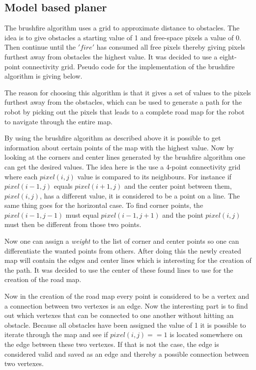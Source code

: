 \documentclass[../Head/Main.tex]{subfiles}
\begin{document}
\subsection{Model based planer}
The brushfire algorithm uses a grid to approximate distance to obstacles. The idea is to give obstacles a starting value of 1 and free-space pixels a value of 0. Then continue until the $'fire'$ has consumed all free pixels thereby giving pixels furthest away from obstacles the highest value. It was decided to use a eight-point connectivity grid. Pseudo code for the implementation of the brushfire algorithm is giving below. \par

The reason for choosing this algorithm is that it gives a set of values to the pixels furthest away from the obstacles, which can be used to generate a path for the robot by picking out the pixels that leads to a complete road map for the robot to navigate through the entire map. \par
By using the brushfire algorithm as described above it is possible to get information about certain points of the map with the highest value. Now by looking at the corners and center lines generated by the brushfire algorithm one can get the desired values. The idea here is the use a 4-point connectivity grid where each $pixel(i,j)$ value is compared to its neighbours. For instance if $pixel(i-1,j)$ equals $pixel(i+1,j)$ and the center point between them, $pixel(i,j)$, has a different value, it is considered to be a point on a line. The same thing goes for the horizontal case. To find corner points, the $pixel(i-1,j-1)$ must equal $pixel(i-1,j+1)$ and the point $pixel(i,j)$ must then be different from those two points. \par

Now one can assign a \textit{weight} to the list of corner and center points so one can differentiate the wanted points from others. After doing this the newly created map will contain the edges and center lines which is interesting for the creation of the path. It was decided to use the center of these found lines to use for the creation of the road map.  

Now in the creation of the road map every point is considered to be a vertex and a connection between two vertexes is an edge. Now the interesting part is to find out which vertexes that can be connected to one another without hitting an obstacle. Because all obstacles have been assigned the value of 1 it is possible to iterate through the map and see if $pixel(i,j) == 1$ is located somewhere on the edge between these two vertexes. If that is not the case, the edge is considered valid and saved as an edge and thereby a possible connection between two vertexes. \par
\end{document}
